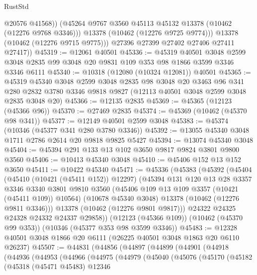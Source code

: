 \begin{lexlean}{RustStd}
\begin{coremodule}
                @20576
                @41568))
            (@45264 @9767 @3560 @45113 @45132 @13378 (@10462 (@12276 @9768 @3346)))
            @13378
            (@10462 (@12276 @9725 @9774)))
          @13378
          (@10462 (@12276 @9715 @9775)))
        @27396
        @27399
        @27402
        @27406
        @27411
        @27417))
@45319 := @12061 @40501
@45336 := @45319
    @40501
    @3048
    @2599
    @3048
    @2835
    @99
    @3048
    @20
    @9831
    @109
    @353
    @98
    @1866
    @3599
    @3346
    @3346
    @6111
@45340 := @10318 (@12080 (@10324 @12081)) @40501
@45365 := @45319
    @45340
    @3048
    @2599
    @3048
    @2835
    @98
    @3048
    @20
    @3463
    @96
    @341
    @280
    @2832
    @3780
    @3346
    @9818
    @9827
    (@12113 @40501 @3048 @2599 @3048 @2835 @3048 @20)
@45366 := @12135 @2835
@45369 := @45365 (@12123 (@45366 @96))
@45370 := @27469 @2835
@45374 := @45369 (@10462 (@45370 @98 @341))
@45377 := @12149 @40501 @2599 @3048
@45383 := @45374 (@10346 (@45377 @341 @280 @3780 @3346))
@45392 := @13055 @45340 @3048 @1711 @2786 @2614 @20 @9818 @9825 @5427
@45394 := @13074 @45340 @3048
@45404 := @45394 @291 @133 @13 @102 @3650 @9817 @9824 @3801 @9800 @3560
@45406 := @10413 @45340 @3048
@45410 := @45406 @152 @13 @152 @3650
@45411 := @10422 @45340
@45471 := @45336
    (@45383
      (@45392
        (@45404
          (@45410 (@10421 (@45411 @152)) @12297)
          (@45394
            @131
            @120
            @13
            @28
            @3357
            @3346
            @3340
            @3801
            @9810
            @3560
            (@45406 @109 @13 @109 @3357 (@10421 (@45411 @109)) @10564)
            (@10678 @45340 @3048)
            @13378
            (@10462 (@12276 @9811 @3346)))
          @13378
          (@10462 (@12276 @9801 @9817)))
        @24322
        @24325
        @24328
        @24332
        @24337
        @29858))
    (@12123 (@45366 @109))
    (@10462 (@45370 @99 @353))
    (@10346 (@45377 @353 @98 @3599 @3346))
@45483 := @12328 @40501 @3048 @1866 @20 @6111 (@26225 @40501 @3048 @1863 @20 @6110 @26237)
@45507 := @44831
    (@44856
      (@44897
        (@44899
          (@44901
            (@44918
              (@44936
                (@44953
                  (@44966
                    (@44975
                      (@44979
                        (@45040
                          (@45076
                            (@45170
                              (@45182
                                (@45318
                                  (@45471 @45483)
                                  @12346

\end{coremodule}
\end{lexlean}
